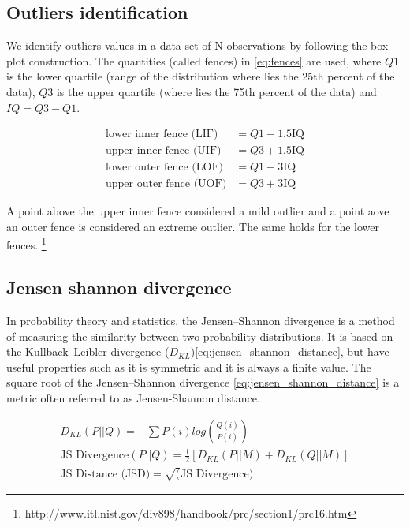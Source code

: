 \subsection{Outliers identification}
\label{sec:outliers_identification}

\par We identify outliers values in a data set of N observations by following the box plot construction. The quantities (called fences) in \ref{eq:fences} are used, where $Q1$ is the lower quartile (range of the distribution where lies the 25th percent of the data), $Q3$ is the upper quartile (where lies the 75th percent of the data) and $IQ = Q3 - Q1$.

\begin{equation}
\begin{split}
\text{lower inner fence (LIF)} & = Q1 - 1.5  \text{IQ} \\
\text{upper inner fence (UIF)} & = Q3 + 1.5  \text{IQ} \\
\text{lower outer fence (LOF)} & = Q1 - 3  \text{IQ} \\
\text{upper outer fence (UOF)} & = Q3 + 3  \text{IQ}
\end{split}
\label{eq:fences}
\end{equation}

\par A point above the upper inner fence considered a mild outlier and a point aove an outer fence is considered an extreme outlier. The same holds for the lower fences. \footnote{http://www.itl.nist.gov/div898/handbook/prc/section1/prc16.htm}

\subsection{Jensen shannon divergence}

\par In probability theory and statistics, the Jensen–Shannon divergence is a method of measuring the similarity between two probability distributions. It is based on the Kullback–Leibler divergence ($D_{KL}$)\ref{eq:jensen_shannon_distance}, but have useful properties such as it is symmetric and it is always a finite value. The square root of the Jensen–Shannon divergence \ref{eq:jensen_shannon_distance} is a metric often referred to as Jensen-Shannon distance. \cite{fuglede2004jensen}

\begin{equation}
\begin{split}
D_{KL}(P||Q) = -\sum{P(i) log(\frac{Q(i)}{P(i)})} \\
\text{JS Divergence}(P||Q) = \frac{1}{2}[D_{KL}(P||M) + D_{KL}(Q||M)] \\
\text{JS Distance (JSD)} = \sqrt(\text{JS Divergence})
\end{split}
\label{eq:jensen_shannon_distance}
\end{equation}


